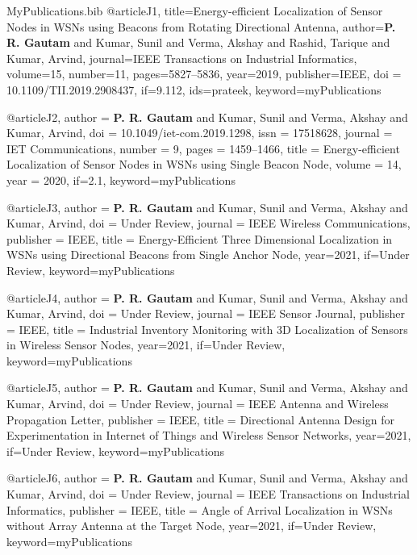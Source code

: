 
\begin{filecontents}{MyPublications.bib}
@article{J1,
  title={Energy-efficient Localization of Sensor Nodes in {WSNs} using Beacons from Rotating Directional Antenna},
  author={\textbf{P. R. {Gautam}} and Kumar, Sunil and Verma, Akshay and Rashid, Tarique and Kumar, Arvind},
  journal={IEEE Transactions on Industrial Informatics},
  volume={15},
  number={11},
  pages={5827--5836},
  year={2019},
  publisher={IEEE},
  doi = {10.1109/TII.2019.2908437},
  if={9.112},
  ids={prateek},
keyword={myPublications}
}

@article{J2,
  author = {\textbf{P. R. {Gautam}} and Kumar, Sunil and Verma, Akshay and Kumar, Arvind},
  doi = {10.1049/iet-com.2019.1298},
  issn = {17518628},
  journal = {IET Communications},
  number = {9},
  pages = {1459--1466},
  title = {Energy-efficient Localization of Sensor Nodes in {WSNs} using Single Beacon Node},
  volume = {14},
  year = {2020},
  if={2.1},
  keyword={myPublications}
}

@article{J3,
  author = {\textbf{P. R. {Gautam}} and Kumar, Sunil and Verma, Akshay and Kumar, Arvind},
  doi = {Under Review},
  journal = {IEEE Wireless Communications},
  publisher = {IEEE},
  title = {Energy-Efficient Three Dimensional Localization in {WSNs} using Directional Beacons from Single Anchor Node},
  year={2021},
  if={Under Review},
  keyword={myPublications}
}

@article{J4,
  author = {\textbf{P. R. {Gautam}} and Kumar, Sunil and Verma, Akshay and Kumar, Arvind},
  doi = {Under Review},
  journal = {IEEE Sensor Journal},
  publisher = {IEEE},
  title = {Industrial Inventory Monitoring with {3D} Localization of Sensors in Wireless Sensor Nodes},
  year={2021},
  if={Under Review},
  keyword={myPublications}
}

@article{J5,
  author = {\textbf{P. R. {Gautam}} and Kumar, Sunil and Verma, Akshay and Kumar, Arvind},
  doi = {Under Review},
  journal = {IEEE Antenna and Wireless Propagation Letter},
  publisher = {IEEE},
  title = {Directional Antenna Design for Experimentation in Internet of Things and Wireless Sensor Networks},
  year={2021},
  if={Under Review},
  keyword={myPublications}
}




@article{J6,
  author = {\textbf{P. R. {Gautam}} and Kumar, Sunil and Verma, Akshay and Kumar, Arvind},
  doi = {Under Review},
  journal = {IEEE Transactions on Industrial Informatics},
  publisher = {IEEE},
  title = {Angle of Arrival Localization in WSNs without Array Antenna at the Target Node},
  year={2021},
  if={Under Review},
  keyword={myPublications}
}



\end{filecontents}
